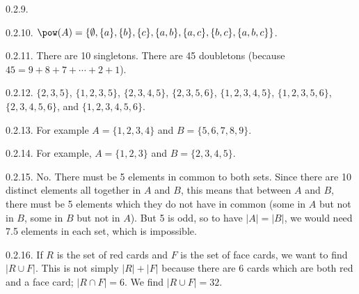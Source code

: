 \begin {itemize}
\begin{ans}{0.2.9.}
\end{ans}
\begin{ans}{0.2.10.}
    $\pow(A) = \{\emptyset, \{a\}, \{b\}, \{c\}, \{a,b\}, \{a,c\}, \{b,c\}, \{a,b,c\}\}$.
  
\end{ans}
\begin{ans}{0.2.11.}
      There are 10 singletons.  There are 45 doubletons (because $45 = 9+8+7+\cdots+2+1$).
  
\end{ans}
\begin{ans}{0.2.12.}
      $\{2,3,5\}$, $\{1,2,3,5\}$, $\{2,3,4,5\}$, $\{2,3,5,6\}$, $\{1,2,3,4,5\}$, $\{1,2,3,5,6\}$, $\{2,3,4,5,6\}$, and $\{1,2,3,4,5,6\}$.
  
\end{ans}
\begin{ans}{0.2.13.}
   For example $A = \{1,2,3,4\}$ and $B = \{5,6,7,8,9\}$.
  
\end{ans}
\begin{ans}{0.2.14.}
    For example, $A = \{1,2,3\}$ and $B = \{2,3,4,5\}$.
  
\end{ans}
\begin{ans}{0.2.15.}
	 No.  There must be 5 elements in common to both sets.  Since there are 10 distinct elements all together in $A$ and $B$, this means that between $A$ and $B$, there must be 5 elements which they do not have in common (some in $A$ but not in $B$, some in $B$ but not in $A$).  But 5 is odd, so to have $|A| = |B|$, we would need 7.5 elements in each set, which is impossible.
	
\end{ans}
\begin{ans}{0.2.16.}
      If $R$ is the set of red cards and $F$ is the set of face cards, we want to find $|R \cup F|$.  This is not simply $|R| + |F|$ because there are 6 cards which are both red and a face card; $|R \cap F| = 6$.  We find $|R \cup F| = 32$.
  
\end{ans}
\protect \end {itemize}

